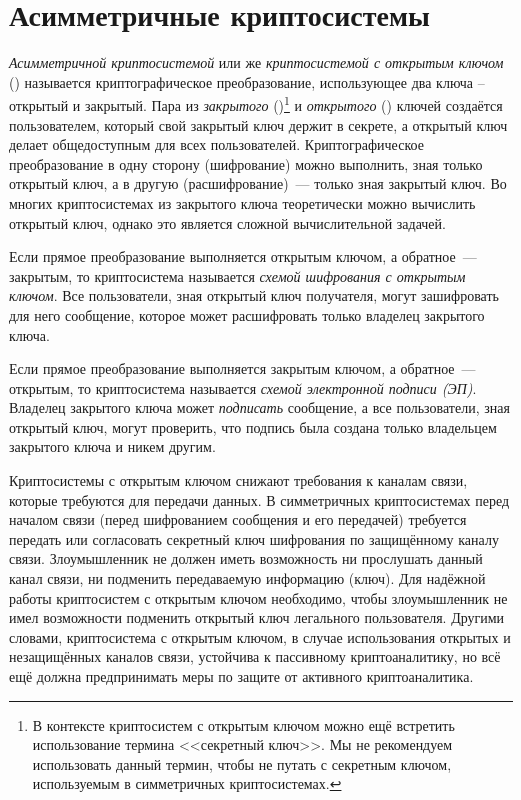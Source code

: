 \chapter{Асимметричные криптосистемы}\label{chapter-public-key}

\emph{Асимметричной криптосистемой} или же \emph{криптосистемой с открытым ключом} () называется криптографическое преобразование, использующее два ключа -- открытый и закрытый. Пара из \emph{закрытого} ()\footnote{В контексте криптосистем с открытым ключом можно ещё встретить использование термина <<секретный ключ>>. Мы не рекомендуем использовать данный термин, чтобы не путать с секретным ключом, используемым в симметричных криптосистемах.} и \emph{открытого} () ключей создаётся пользователем, который свой закрытый ключ держит в секрете, а открытый ключ делает общедоступным для всех пользователей. Криптографическое преобразование в одну сторону (шифрование) можно выполнить, зная только открытый ключ, а в другую (расшифрование)~--- только зная закрытый ключ. Во многих криптосистемах из закрытого ключа теоретически можно вычислить открытый ключ, однако это является сложной вычислительной задачей.

Если прямое преобразование выполняется открытым ключом, а обратное~--- закрытым, то криптосистема называется \emph{схемой шифрования с открытым ключом}. Все пользователи, зная открытый ключ получателя, могут зашифровать для него сообщение, которое может расшифровать только владелец закрытого ключа.

Если прямое преобразование выполняется закрытым ключом, а обратное~--- открытым, то криптосистема называется \emph{схемой электронной подписи (ЭП)}. Владелец закрытого ключа может \emph{подписать} сообщение, а все пользователи, зная открытый ключ, могут проверить, что подпись была создана только владельцем закрытого ключа и никем другим.

Криптосистемы с открытым ключом снижают требования к каналам связи, которые требуются для передачи данных. В симметричных криптосистемах перед началом связи (перед шифрованием сообщения и его передачей) требуется передать или согласовать секретный ключ шифрования по защищённому каналу связи. Злоумышленник не должен иметь возможность ни прослушать данный канал связи, ни подменить передаваемую информацию (ключ). Для надёжной работы криптосистем с открытым ключом необходимо, чтобы злоумышленник не имел возможности подменить открытый ключ легального пользователя. Другими словами, криптосистема с открытым ключом, в случае использования открытых и незащищённых каналов связи, устойчива к пассивному криптоаналитику, но всё ещё должна предпринимать меры по защите от активного криптоаналитика.

